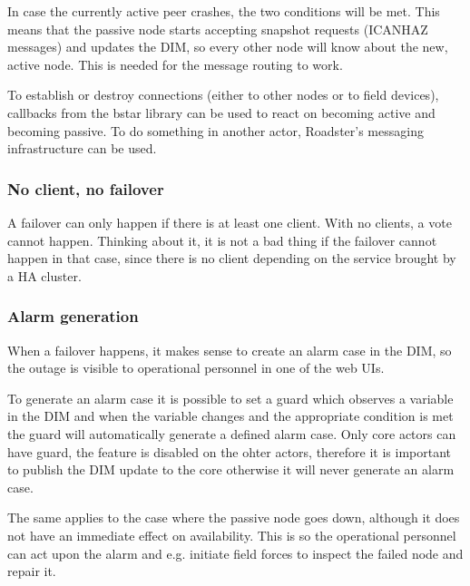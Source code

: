 In case the currently active peer crashes, the two conditions will be met.
This means that the passive node starts accepting snapshot requests (ICANHAZ
messages) and updates the DIM, so every other node will know about the new,
active node. This is needed for the message routing to work.

To establish or destroy connections (either to other nodes or to field
devices), callbacks from the \gls{bstar} library can be used to react on
becoming active and becoming passive. To do something in another actor,
Roadster's messaging infrastructure can be used.





\subsubsection{No client, no failover}
A failover can only happen if there is at least one client. With no clients, a
vote cannot happen. Thinking about it, it is not a bad thing if the failover
cannot happen in that case, since there is no client depending on the service
brought by a HA cluster.

\subsubsection{Alarm generation}
When a failover happens, it makes sense to create an alarm case in the
DIM, so the outage is visible to operational personnel in one of the web UIs.

To generate an alarm case it is possible to set a guard which observes
a variable in the DIM and when the variable changes and the appropriate 
condition is met the guard will automatically generate a defined alarm case.
Only core actors can have guard, the feature is disabled on the ohter actors,
therefore it is important to publish the DIM update to the core otherwise
it will never generate an alarm case.

The same applies to the case where the passive node goes down, although it
does not have an immediate effect on availability.  This is so the operational
personnel can act upon the alarm and e.g. initiate field forces to inspect the
failed node and repair it.

